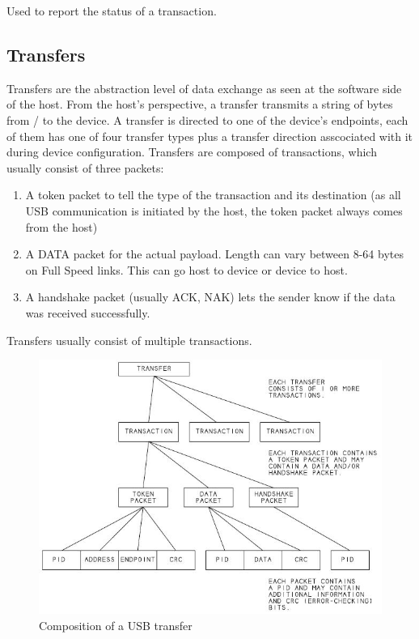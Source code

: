 \documentclass{article}
\begin{document}
Used to report the status of a transaction.

\subsection{Transfers}

Transfers are the abstraction level of data exchange as seen at the software
side of the host. From the host's perspective, a transfer transmits a string of
 bytes from / to the device. A transfer is directed to one of the device's endpoints,
each of them has one of four transfer types plus a transfer direction
asscociated with it during device configuration.
Transfers are composed of transactions, which usually consist of three
packets: 

\begin{enumerate}
  \item A token packet to tell the type of the transaction and its destination
        (as all USB communication is initiated by the host, the token packet always comes
        from the host)
  \item A DATA packet for the actual payload. Length can vary between 8-64 bytes on Full Speed links.
        This can go host to device or device to host.
  \item A handshake packet (usually ACK, NAK) lets the sender know if the data was received successfully.
\end{enumerate}

Transfers usually consist of multiple transactions.

\begin{figure}[H]
  \caption{Composition of a USB transfer}
  \centering
  \includegraphics[width=\textwidth]{images/transfer_tree.jpg}
\end{figure}
\end{document}
